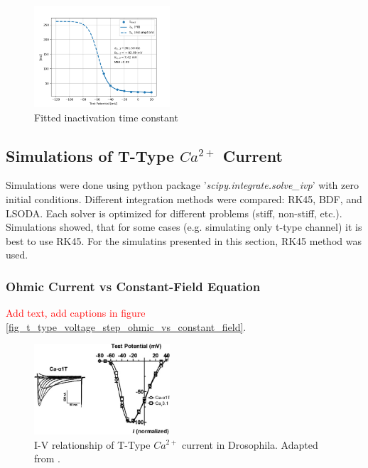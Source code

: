 \documentclass[../../workflow.tex]{subfiles}
\begin{document}
\begin{figure}[H]
    \centering
    \includegraphics[width=0.45\textwidth]{./img/t_type_calcium_channel/inactivation_tau_fit_2.png}
    \caption{Fitted inactivation time constant}
    \label{fig:data_fitted_taus_from_jeong_inactivation}
\end{figure}

\FloatBarrier


\subsection{Simulations of T-Type \texorpdfstring{$Ca^{2+}$}{Ca+2} Current}\label{subsec_r5_simulations_t_type_current}

Simulations were done using python package '\textit{scipy.integrate.solve\_ivp}' with
zero initial conditions. Different integration methods were compared: RK45, BDF, and LSODA.
Each solver is optimized for different problems (stiff, non-stiff, etc.). Simulations
showed, that for some cases (e.g. simulating only t-type channel) it is best to use
RK45. For the simulatins presented in this section, RK45 method was used.

\subsubsection{Ohmic Current vs Constant-Field Equation}

\textcolor{red}{Add text, add captions in figure \ref{fig_t_type_voltage_step_ohmic_vs_constant_field}}.

\begin{figure}[H]
    \centering
    \includegraphics[width=0.45\textwidth]{./img/t_type_calcium_channel/iv_relationship_jeong_2015.png}
    \caption{I-V relationship of T-Type $Ca^{2+}$ current in Drosophila. Adapted from \cite{jeongCaa1TFlyTtype2015}.}
\end{figure}
\end{document}
